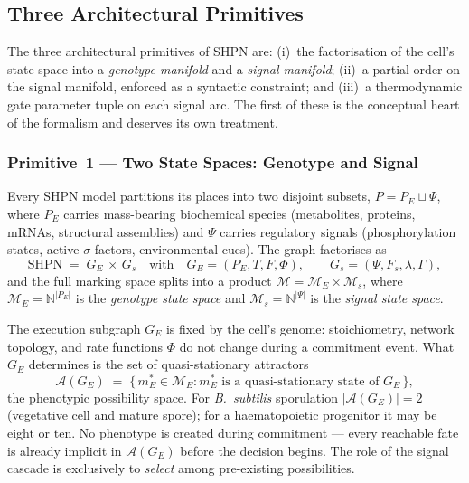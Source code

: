 \documentclass[11pt,a4paper]{article}
\newcommand{\Gs}{G_s}
\newcommand{\Ge}{G_E}
\newcommand{\Aset}{\mathcal{A}}
\begin{document}
\subsection{Three Architectural Primitives}

The three architectural primitives of SHPN are: (i)~the factorisation
of the cell's state space into a \emph{genotype manifold} and a
\emph{signal manifold}; (ii)~a partial order on the signal manifold,
enforced as a syntactic constraint; and (iii)~a thermodynamic gate
parameter tuple on each signal arc.  The first of these is the
conceptual heart of the formalism and deserves its own treatment.

\subsubsection{Primitive~1 --- Two State Spaces: Genotype and Signal}
\label{sssec:two-spaces}

Every SHPN model partitions its places into two disjoint subsets,
\(P = P_E \sqcup \Psi\), where \(P_E\) carries mass-bearing biochemical
species (metabolites, proteins, mRNAs, structural assemblies) and
\(\Psi\) carries regulatory signals (phosphorylation states, active
\(\sigma\) factors, environmental cues).  The graph factorises as
\begin{equation}
  \mathrm{SHPN} \;=\; \Ge \,\times\, \Gs
  \quad\text{with}\quad
  \Ge = (P_E, T, F, \Phi), \qquad
  \Gs = (\Psi, F_s, \lambda, \Gamma),
  \label{eq:factorisation}
\end{equation}
and the full marking space splits into a product
\(\mathcal{M} = \mathcal{M}_E \times \mathcal{M}_s\),
where \(\mathcal{M}_E = \mathbb{N}^{|P_E|}\) is the \emph{genotype state
space} and \(\mathcal{M}_s = \mathbb{N}^{|\Psi|}\) is the \emph{signal state space}.

The execution subgraph \(\Ge\) is fixed by the cell's genome:
stoichiometry, network topology, and rate functions \(\Phi\) do not
change during a commitment event.  What \(\Ge\) determines is the set
of quasi-stationary attractors
\begin{equation}
  \Aset(\Ge) \;=\; \bigl\{\, m_E^{*} \in \mathcal{M}_E :
  m_E^{*} \text{ is a quasi-stationary state of } \Ge \,\bigr\},
  \label{eq:attractor-set}
\end{equation}
the phenotypic possibility space.
For \textit{B.~subtilis} sporulation \(|\Aset(\Ge)| = 2\) (vegetative
cell and mature spore); for a haematopoietic progenitor it may be eight
or ten.  No phenotype is created during commitment --- every reachable
fate is already implicit in \(\Aset(\Ge)\) before the decision begins.
The role of the signal cascade is exclusively to \emph{select} among
pre-existing possibilities.
\end{document}
